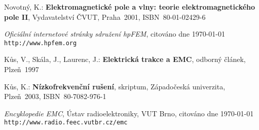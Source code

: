 
%


\begin{thebibliography}{9}
{\sc Novotný, K.:}  {\bf Elektromagnetické pole a vlny: teorie elektromagnetického pole II},
Vydavatelství ČVUT, Praha~2001, \mbox{ISBN 80-01-02429-6}

{\em Oficiální internetové stránky sdružení hpFEM},
citováno dne \today \\
\texttt{http://www.hpfem.org}

{\sc Kůs, V., Skála, J., Laurenc, J.:}  {\bf Elektrická trakce a EMC},
odborný článek, Plzeň~1997

{\sc Kůs, K.:}  {\bf Nízkofrekvenční rušení},
skriptum, Západočeská univerzita, Plzeň~2003, \mbox{ISBN 80-7082-976-1}

{\em Encyklopedie EMC}, Ústav radioelektroniky, VUT Brno,
citováno dne \today \\
\texttt{http://www.radio.feec.vutbr.cz/emc}


\end{thebibliography}

